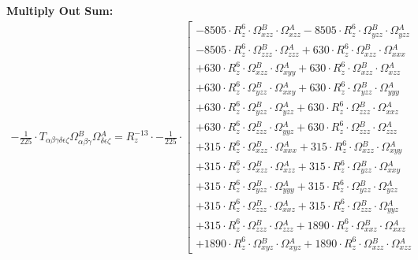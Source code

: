 \documentclass{article}
\begin{document}
\textbf{Multiply Out Sum:}
\begin{subequations}\begin{gather}
- \frac{1}{225} \cdot T_{\alpha{}\beta{}\gamma{}\delta{}\epsilon{}\zeta{}} \Omega{}^{B}_{\alpha{}\beta{}\gamma{}} \Omega{}^{A}_{\delta{}\epsilon{}\zeta{}} = R_{z}^{-13} \cdot - \frac{1}{225} \cdot  \left[ \begin{array}{c} 
 		- 8505 \cdot R_{z}^{6} \cdot \Omega{}^{B}_{xzz} \cdot \Omega{}^{A}_{xzz}- 8505 \cdot R_{z}^{6} \cdot \Omega{}^{B}_{yzz} \cdot \Omega{}^{A}_{yzz} 
 \\[0.2em] 		 - 8505 \cdot R_{z}^{6} \cdot \Omega{}^{B}_{zzz} \cdot \Omega{}^{A}_{zzz}+ 630 \cdot R_{z}^{6} \cdot \Omega{}^{B}_{xzz} \cdot \Omega{}^{A}_{xxx} 
 \\[0.2em] 		 + 630 \cdot R_{z}^{6} \cdot \Omega{}^{B}_{xzz} \cdot \Omega{}^{A}_{xyy}+ 630 \cdot R_{z}^{6} \cdot \Omega{}^{B}_{xzz} \cdot \Omega{}^{A}_{xzz} 
 \\[0.2em] 		 + 630 \cdot R_{z}^{6} \cdot \Omega{}^{B}_{yzz} \cdot \Omega{}^{A}_{xxy}+ 630 \cdot R_{z}^{6} \cdot \Omega{}^{B}_{yzz} \cdot \Omega{}^{A}_{yyy} 
 \\[0.2em] 		 + 630 \cdot R_{z}^{6} \cdot \Omega{}^{B}_{yzz} \cdot \Omega{}^{A}_{yzz}+ 630 \cdot R_{z}^{6} \cdot \Omega{}^{B}_{zzz} \cdot \Omega{}^{A}_{xxz} 
 \\[0.2em] 		 + 630 \cdot R_{z}^{6} \cdot \Omega{}^{B}_{zzz} \cdot \Omega{}^{A}_{yyz}+ 630 \cdot R_{z}^{6} \cdot \Omega{}^{B}_{zzz} \cdot \Omega{}^{A}_{zzz} 
 \\[0.2em] 		 + 315 \cdot R_{z}^{6} \cdot \Omega{}^{B}_{xzz} \cdot \Omega{}^{A}_{xxx}+ 315 \cdot R_{z}^{6} \cdot \Omega{}^{B}_{xzz} \cdot \Omega{}^{A}_{xyy} 
 \\[0.2em] 		 + 315 \cdot R_{z}^{6} \cdot \Omega{}^{B}_{xzz} \cdot \Omega{}^{A}_{xzz}+ 315 \cdot R_{z}^{6} \cdot \Omega{}^{B}_{yzz} \cdot \Omega{}^{A}_{xxy} 
 \\[0.2em] 		 + 315 \cdot R_{z}^{6} \cdot \Omega{}^{B}_{yzz} \cdot \Omega{}^{A}_{yyy}+ 315 \cdot R_{z}^{6} \cdot \Omega{}^{B}_{yzz} \cdot \Omega{}^{A}_{yzz} 
 \\[0.2em] 		 + 315 \cdot R_{z}^{6} \cdot \Omega{}^{B}_{zzz} \cdot \Omega{}^{A}_{xxz}+ 315 \cdot R_{z}^{6} \cdot \Omega{}^{B}_{zzz} \cdot \Omega{}^{A}_{yyz} 
 \\[0.2em] 		 + 315 \cdot R_{z}^{6} \cdot \Omega{}^{B}_{zzz} \cdot \Omega{}^{A}_{zzz}+ 1890 \cdot R_{z}^{6} \cdot \Omega{}^{B}_{xxz} \cdot \Omega{}^{A}_{xxz} 
 \\[0.2em] 		 + 1890 \cdot R_{z}^{6} \cdot \Omega{}^{B}_{xyz} \cdot \Omega{}^{A}_{xyz}+ 1890 \cdot R_{z}^{6} \cdot \Omega{}^{B}_{xzz} \cdot \Omega{}^{A}_{xzz} 

\end{array}
\end{gather}
\end{subequations}
\end{document}
